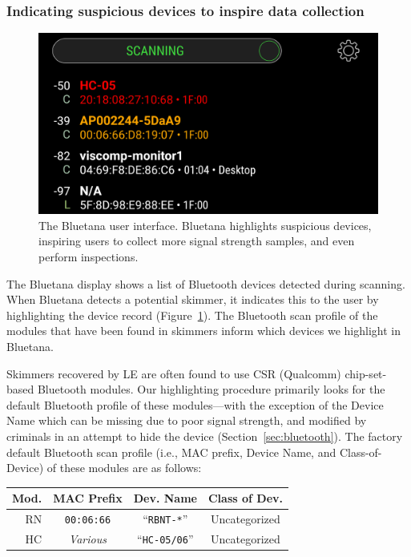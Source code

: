 \subsubsection*{Indicating suspicious devices to inspire data collection}

\begin{figure}
\centering
\captionsetup{justification=centering}
\includegraphics[width=0.8\linewidth]{skimmer/fig/bluetana_screenshot}
\caption{
\label{fig:bluetana}
The Bluetana user interface. Bluetana highlights suspicious devices, inspiring users to collect more
signal strength samples, and even perform inspections.
}
\end{figure}



The Bluetana display shows a list of Bluetooth devices detected during scanning.
%
When Bluetana detects a potential skimmer, it indicates this to the user by
highlighting the device record (Figure~\ref{fig:bluetana}).
%
The Bluetooth scan profile of the modules that have been found in skimmers inform which devices we highlight in Bluetana.
 
Skimmers recovered by LE are often found to use CSR (Qualcomm) chip-set-based Bluetooth modules.
%
Our highlighting procedure primarily looks for the default Bluetooth profile of
these modules---with the exception of the Device Name which can be missing due to poor
signal strength, and modified by criminals in an attempt to hide the device (Section~\ref{sec:bluetooth}).
%
The factory default Bluetooth scan profile (i.e., MAC prefix, Device Name, and
Class-of-Device) of these modules are as follows:

\begin{center}
    \begin{tabular}{r|c|c|c}
        \textbf{Mod.} & \textbf{MAC Prefix} & \textbf{Dev. Name} & \textbf{Class of Dev.} \\ 
        \hline RN & \texttt{00:06:66} & ``\texttt{RBNT-*}'' & Uncategorized
				\\ HC & \textit{Various} & ``\texttt{HC-05/06}'' & Uncategorized \\
    \end{tabular}
\end{center}


